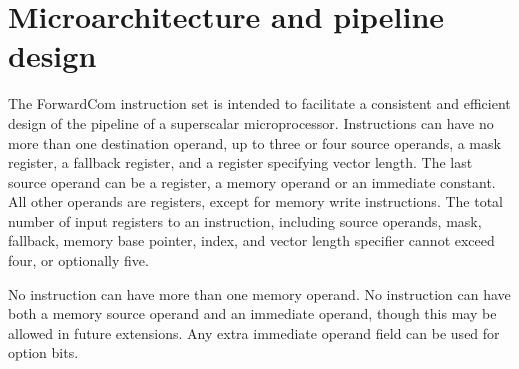 \documentclass[forwardcom.tex]{subfiles}
\begin{document}
\RaggedRight

\chapter{Microarchitecture and pipeline design}
The ForwardCom instruction set is intended to facilitate a consistent and efficient design of the pipeline of a superscalar microprocessor. Instructions can have no more than one destination operand, up to three or four source operands, a mask register, a fallback register, and a register specifying vector length. The last source operand can be a register, a memory operand or an immediate constant. All other operands are registers, except for memory write instructions. The total number of input registers to an instruction, including source operands, mask, fallback, memory base pointer, index, and vector length specifier cannot exceed four, or optionally five.
\vspace{2mm}

No instruction can have more than one memory operand. No instruction can have both a memory source operand and an immediate operand, though this may be allowed in future extensions. Any extra immediate operand field can be used for option bits. 
\vspace{2mm}
\end{document}
